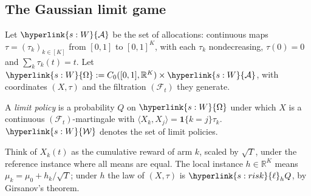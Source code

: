 \documentclass[11pt]{article}
\newcommand{\dt}[1]{\hypertarget{#1}{}}
\DeclareRobustCommand{\sy}[2]{{\hyperlink{#1}{#2}}}
\newcommand{\R}{\mathbb{R}}
\newcommand{\1}{\mathbf{1}}
\newcommand{\Wc}{\sy{s:W}{\mathcal W}}
\newcommand{\Om}{\sy{s:W}{\Omega}}
\newcommand{\Al}{\sy{s:W}{\mathcal A}}
\newcommand{\lh}{\sy{s:risk}{\ell}}
\begin{document}
\subsection{The Gaussian limit game}\label{sec:game}
\begin{definition}\label{def:alloc}\dt{s:W}
Let $\Al$ be the set of allocations: continuous maps $\tau=(\tau_k)_{k\in[K]}$ from $[0,1]$ to $[0,1]^K$, with each $\tau_k$
nondecreasing, $\tau(0)=0$ and $\sum_k\tau_k(t)=t$. Let $\Om:=C_0([0,1],\R^K)\times\Al$, with coordinates $(X,\tau)$ and the filtration $(\mathcal F_t)$ they generate.
\end{definition}
\begin{definition}\label{def:limit}
A \emph{limit policy} is a probability $Q$ on $\Om$ under which $X$ is a continuous $(\mathcal F_t)$-martingale with $\langle X_k,X_j\rangle=\1\{k=j\}\tau_k$.
$\Wc$ denotes the set of limit policies.
\end{definition}
\noindent Think of $X_k(t)$ as the cumulative reward of arm $k$, scaled by $\sqrt T$, under the reference instance where all means are equal. The local
instance $h\in\R^K$ means $\mu_k=\mu_0+h_k/\sqrt T$; under $h$ the law of $(X,\tau)$ is $\lh_hQ$, by Girsanov's theorem.
\end{document}
